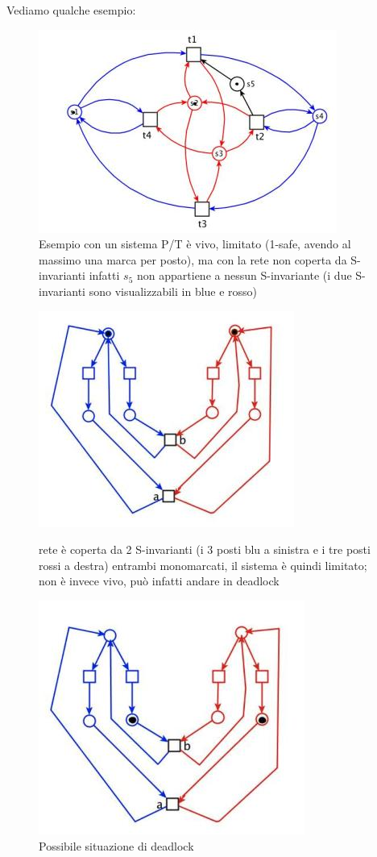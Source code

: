 \documentclass[a4paper,12pt, oneside]{book}
\begin{document}
\begin{esempio}
  Vediamo qualche esempio:
  \begin{figure}[H]
    \centering
    \includegraphics[scale = 0.7]{img/si11.jpg}
    \caption{Esempio con un sistema P/T è vivo, limitato (1-safe, avendo al
      massimo una marca per posto), ma con la rete non coperta da S-invarianti
      infatti $s_5$ non appartiene a nessun S-invariante (i due S-invarianti
      sono visualizzabili in blue e rosso)}
  \end{figure}
  \begin{figure}[H]
    \centering
    \includegraphics[scale = 0.7]{img/si12.jpg}
    \caption{rete è coperta da 2 S-invarianti (i 3 posti blu a sinistra e i tre
      posti rossi a destra) entrambi monomarcati, il sistema è quindi limitato;
      non è invece vivo, può infatti andare in deadlock}
    \includegraphics[scale = 0.7]{img/si13.jpg}
    \caption{Possibile situazione di deadlock }
  \end{figure}
\end{esempio}
\end{document}
